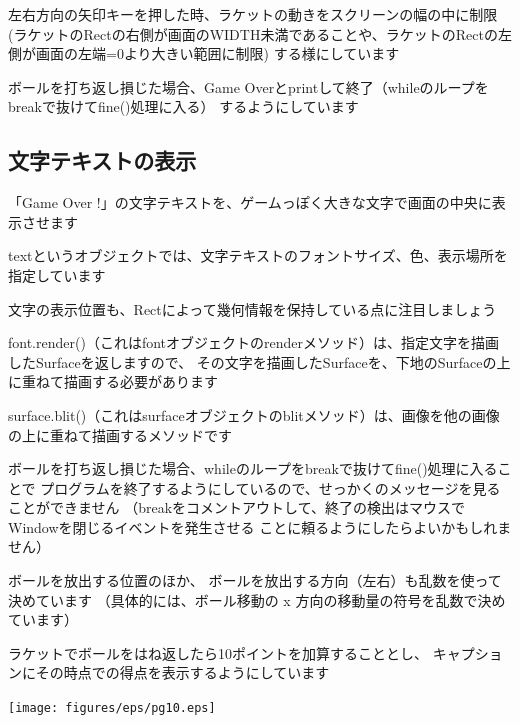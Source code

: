 \documentclass[uplatex,a4paper,11pt,oneside,openany]{jsbook}
\begin{document}
左右方向の矢印キーを押した時、ラケットの動きをスクリーンの幅の中に制限
(ラケットのRectの右側が画面のWIDTH未満であることや、ラケットのRectの左側が画面の左端=0より大きい範囲に制限)
する様にしています




ボールを打ち返し損じた場合、Game Overとprintして終了（whileのループをbreakで抜けてfine()処理に入る）
するようにしています

\subsection{文字テキストの表示}

「Game Over !」の文字テキストを、ゲームっぽく大きな文字で画面の中央に表示させます

textというオブジェクトでは、文字テキストのフォントサイズ、色、表示場所を指定しています

文字の表示位置も、Rectによって幾何情報を保持している点に注目しましょう

font.render()（これはfontオブジェクトのrenderメソッド）は、指定文字を描画したSurfaceを返しますので、
その文字を描画したSurfaceを、下地のSurfaceの上に重ねて描画する必要があります

surface.blit()（これはsurfaceオブジェクトのblitメソッド）は、画像を他の画像の上に重ねて描画するメソッドです



ボールを打ち返し損じた場合、whileのループをbreakで抜けてfine()処理に入ることで
プログラムを終了するようにしているので、せっかくのメッセージを見ることができません
（breakをコメントアウトして、終了の検出はマウスでWindowを閉じるイベントを発生させる
ことに頼るようにしたらよいかもしれません）

ボールを放出する位置のほか、
ボールを放出する方向（左右）も乱数を使って決めています
（具体的には、ボール移動の x 方向の移動量の符号を乱数で決めています）

ラケットでボールをはね返したら10ポイントを加算することとし、
キャプションにその時点での得点を表示するようにしています

\begin{center}
\texttt{[image: figures/eps/pg10.eps]}
\end{center}
\end{document}
